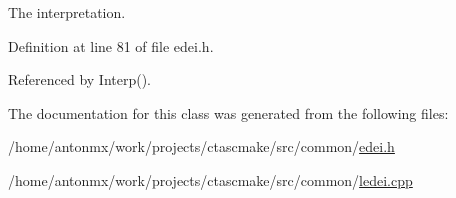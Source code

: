 The interpretation. 



Definition at line 81 of file edei.h.



Referenced by Interp().



The documentation for this class was generated from the following files:\begin{DoxyCompactItemize}
\item 
/home/antonmx/work/projects/ctascmake/src/common/\hyperlink{edei_8h}{edei.h}\item 
/home/antonmx/work/projects/ctascmake/src/common/\hyperlink{ledei_8cpp}{ledei.cpp}\end{DoxyCompactItemize}
